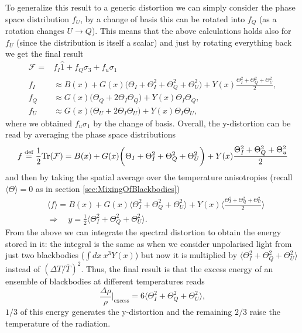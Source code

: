 To generalize this result to a generic distortion we can simply consider the phase space distribution $f_U$, by a change of basis this can be rotated into $f_Q$ (as a rotation changes $U\rightarrow Q$). This means that the above calculations holds also for $f_U$ (since the distribution is itself a scalar) and just by rotating everything back we get the final result
\begin{subequations}\label{eq:y-dist_polarization_components}
\begin{align}
    \mathcal{F}=&f_I\hat 1+f_Q\sigma_3+f_u\sigma_1 \\
    f_I&\approx B(x)+G(x)\bigg(\Theta_I+\Theta^2_I+\Theta^2_Q+\Theta^2_U\bigg)+Y(x)\frac{\Theta^2_I+\Theta^2_Q+\Theta^2_U}{2},\\
    f_Q&\approx G(x)\bigg(\Theta_Q+2\Theta_I\Theta_Q\bigg)+Y(x)\Theta_I\Theta_Q,\\
    f_U&\approx G(x)\bigg(\Theta_U+2\Theta_I\Theta_U\bigg)+Y(x)\Theta_I\Theta_U,
\end{align}
\end{subequations}
where we obtained $f_u\sigma_1$ by the change of basis.
Overall, the y-distortion can be read by averaging the phase space distributions 
$$ f\stackrel{\text{def}}{=}\frac{1}{2}\text{Tr}(\mathcal{F} )= B(x)+G(x)\bigg(\Theta_I+\Theta^2_I+\Theta^2_Q+\Theta^2_U\bigg)+Y(x)\frac{\Theta^2_I+\Theta^2_Q+\Theta^2_u}{2}$$
and then by taking the spatial average over the temperature anisotropies (recall $\langle\Theta\rangle=0$ as in section \ref{sec:MixingOfBlackbodies}) 
\begin{align}
    &\langle f\rangle=B(x)+G(x)\bigg\langle \Theta^2_I+\Theta^2_Q+\Theta^2_U\bigg\rangle+Y(x)\bigg\langle\frac{\Theta^2_I+\Theta^2_Q+\Theta^2_U}{2}\bigg\rangle\nonumber\\
    &\Longrightarrow\quad \boxed{y=\frac{1}{2}\bigg\langle\Theta^2_I+\Theta^2_Q+\Theta^2_U\bigg\rangle}.\label{eq:y-distortion_polarization}
\end{align}
From the above we can integrate the spectral distortion to obtain the energy stored in it: the integral is the same as when we consider unpolarised light from just two blackbodies ($\int dx\ x^3 Y(x)$) but now it is multiplied by $\big\langle\Theta^2_I+\Theta^2_Q+\Theta^2_U\big\rangle$ instead of $(\Delta T/\bar T)^2$. Thus, the final result is that the excess energy of an ensemble of blackbodies at different temperatures reads 
\begin{equation}
    \frac{\Delta \rho}{\rho}\bigg|_\text{excess}=6\bigg\langle\Theta^2_I+\Theta^2_Q+\Theta^2_U\bigg\rangle,\label{eq:polarize_mixing_excess_energy}
\end{equation}
$1/3$ of this energy generates the y-distortion and the remaining $2/3$ raise the temperature of the radiation.

